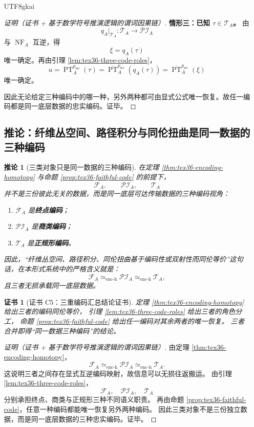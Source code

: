 \documentclass[12pt]{article}
\newtheorem{corollary}{推论}[section]
\newtheorem{Certificate}{证书}[section]
\newcommand{\PT}{\operatorname{PT}}
\newcommand{\NF}{\operatorname{NF}}
\begin{document}
\begin{CJK*}{UTF8}{gkai}
\begin{proof}[证明（证书 + 基于数学符号推演逻辑的谓词因果链）]
\textbf{情形三：已知 $\tau\in\mathcal T_A$。}
由
\[
  q_A|_{\mathcal T_A}:\mathcal T_A\to \mathcal{PI}_A
\]
与 $\NF_A$ 互逆，得
\[
  \xi=q_A(\tau)
\]
唯一确定。再由引理 \ref{lem:tex36-three-code-roles}，
\[
  u=\PT_A^{p_{\mathrm{src}}}(\tau)
  =
  \overline{\PT}_A^{p_{\mathrm{src}}}(q_A(\tau))
  =
  \overline{\PT}_A^{p_{\mathrm{src}}}(\xi)
\]
唯一确定。

因此无论给定三种编码中的哪一种，另外两种都可由显式公式唯一恢复。故任一编码都是同一底层数据的忠实编码。证毕。
\end{proof}

\subsection{推论：纤维丛空间、路径积分与同伦扭曲是同一数据的三种编码}
\label{subsec:tex36-three-codes-summary}

\begin{corollary}[三类对象只是同一数据的三种编码]
\label{cor:tex36-three-codes}
在定理 \ref{thm:tex36-encoding-homotopy} 与命题 \ref{prop:tex36-faithful-code} 的前提下，
\[
  \mathcal F_A,\qquad
  \mathcal{PI}_A,\qquad
  \mathcal T_A
\]
并不是三份彼此无关的数据，而是同一底层可达传输数据的三种编码视角：
\begin{enumerate}
  \item $\mathcal F_A$ 是\textbf{终点编码}；
  \item $\mathcal{PI}_A$ 是\textbf{商类编码}；
  \item $\mathcal T_A$ 是\textbf{正规形编码}。
\end{enumerate}
因此，“纤维丛空间、路径积分、同伦扭曲基于编码性或双射性而同伦等价”这句话，在本形式系统中的严格含义就是：
\[
  \mathcal F_A
  \simeq_{\mathrm{enc\text{-}h}}
  \mathcal{PI}_A
  \simeq_{\mathrm{enc\text{-}h}}
  \mathcal T_A,
\]
且三者无损承载同一底层数据。
\end{corollary}

\begin{Certificate}[证书 C5：三重编码汇总结论证书]
\label{cert:tex36-c5}
定理 \ref{thm:tex36-encoding-homotopy} 给出三者的编码同伦等价，
引理 \ref{lem:tex36-three-code-roles} 给出三者的角色分工，
命题 \ref{prop:tex36-faithful-code} 给出任一编码对其余两者的唯一恢复。
三者合并即得“同一数据三种编码”的结论。
\end{Certificate}

\begin{proof}[证明（证书 + 基于数学符号推演逻辑的谓词因果链）]
由定理 \ref{thm:tex36-encoding-homotopy}，
\[
  \mathcal F_A
  \simeq_{\mathrm{enc\text{-}h}}
  \mathcal{PI}_A
  \simeq_{\mathrm{enc\text{-}h}}
  \mathcal T_A.
\]
这说明三者之间存在显式互逆编码映射，故信息可以无损往返搬运。
由引理 \ref{lem:tex36-three-code-roles}，
\[
  \mathcal F_A,\quad \mathcal{PI}_A,\quad \mathcal T_A
\]
分别承担终点、商类与正规形三种不同语义职责。
再由命题 \ref{prop:tex36-faithful-code}，任意一种编码都能唯一恢复另外两种编码。
因此三类对象不是三份独立数据，而是同一底层数据的三种忠实编码。证毕。
\end{proof}


\end{CJK*}
\end{document}
